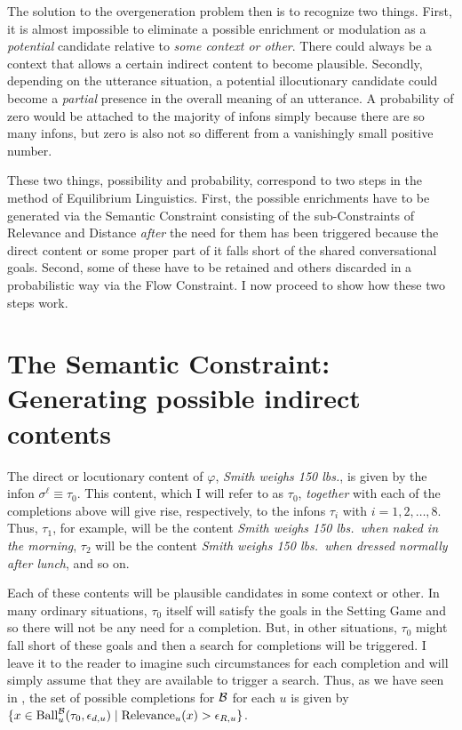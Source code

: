 The solution to the overgeneration problem then is to recognize two things. First, it is almost impossible to eliminate a possible enrichment or modulation as a \emph{potential} candidate relative to \emph{some context or other}. There could always be a context that allows a certain indirect content to become plausible. Secondly, depending on the utterance situation, a potential illocutionary candidate could become a \emph{partial} presence in the overall meaning of an utterance. A probability of zero would be attached to the majority of infons simply because there are so many infons, but zero is also not so different from a vanishingly small positive number. 

These two things, possibility and probability, correspond to two steps in the method of Equilibrium Linguistics. First, the possible enrichments have to be generated via the Semantic Constraint consisting of the sub-Constraints of Relevance and Distance \emph{after} the need for them has been triggered because the direct content or some proper part of it falls short of the shared conversational goals. Second, some of these have to be retained and others discarded in a probabilistic way via the Flow Constraint. I now proceed to show how these two steps work.

\section{The Semantic Constraint: Generating possible indirect contents}

The direct or locutionary content of $\varphi$, \emph{Smith weighs 150 lbs.}, is given by the infon $\sigma^\ell \equiv \tau_0$. This content, which I will refer to as $\tau_0$, \emph{together} with each of the completions above will give rise, respectively, to the infons $\tau_i$ with $i = 1, 2, \ldots, 8$. Thus, $\tau_{1}$, for example, will be the content \emph{Smith weighs 150 lbs.\ when naked in the morning}, $\tau_{2}$ will be the content \emph{Smith weighs 150 lbs.\ when dressed normally after lunch}, and so on.

Each of these contents will be plausible candidates in some context or other. In many ordinary situations, $\tau_0$ itself will satisfy the goals in the Setting Game and so there will not be any need for a completion. But, in other situations, $\tau_0$ might fall short of these goals and then a search for completions will be triggered. I leave it to the reader to imagine such circumstances for each completion and will simply assume that they are available to trigger a search. Thus, as we have seen in , the set of possible completions for $\cal B$ for each $u$ is given by $\{ x \in \hbox{Ball}^{\cal B}_u(\tau_0, \epsilon_{d,u}) \mid  \hbox{Relevance}_u(x) > \epsilon_{R,u} \}$.

